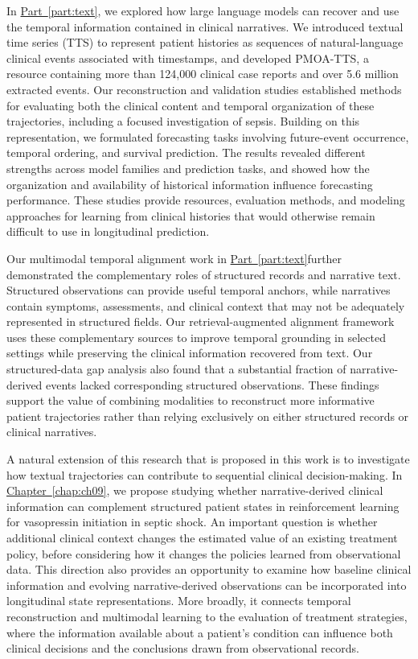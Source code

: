 In \hyperref[part:text]{Part~\ref*{part:text}}, we explored how large language models can recover and use the temporal information contained in clinical narratives.
We introduced textual time series (TTS) to represent patient histories as sequences of natural-language clinical events associated with timestamps, and developed PMOA-TTS, a resource containing more than 124,000 clinical case reports and over 5.6 million extracted events.
Our reconstruction and validation studies established methods for evaluating both the clinical content and temporal organization of these trajectories, including a focused investigation of sepsis.
Building on this representation, we formulated forecasting tasks involving future-event occurrence, temporal ordering, and survival prediction.
The results revealed different strengths across model families and prediction tasks, and showed how the organization and availability of historical information influence forecasting performance.
These studies provide resources, evaluation methods, and modeling approaches for learning from clinical histories that would otherwise remain difficult to use in longitudinal prediction.

Our multimodal temporal alignment work in \hyperref[part:text]{Part~\ref*{part:text}}further demonstrated the complementary roles of structured records and narrative text.
Structured observations can provide useful temporal anchors, while narratives contain symptoms, assessments, and clinical context that may not be adequately represented in structured fields.
Our retrieval-augmented alignment framework uses these complementary sources to improve temporal grounding in selected settings while preserving the clinical information recovered from text.
Our structured-data gap analysis also found that a substantial fraction of narrative-derived events lacked corresponding structured observations.
These findings support the value of combining modalities to reconstruct more informative patient trajectories rather than relying exclusively on either structured records or clinical narratives.

A natural extension of this research that is proposed in this work is to investigate how textual trajectories can contribute to sequential clinical decision-making.
In \hyperref[chap:ch09]{Chapter~\ref*{chap:ch09}}, we propose studying whether narrative-derived clinical information can complement structured patient states in reinforcement learning for vasopressin initiation in septic shock.
An important question is whether additional clinical context changes the estimated value of an existing treatment policy, before considering how it changes the policies learned from observational data.
This direction also provides an opportunity to examine how baseline clinical information and evolving narrative-derived observations can be incorporated into longitudinal state representations.
More broadly, it connects temporal reconstruction and multimodal learning to the evaluation of treatment strategies, where the information available about a patient's condition can influence both clinical decisions and the conclusions drawn from observational records.


